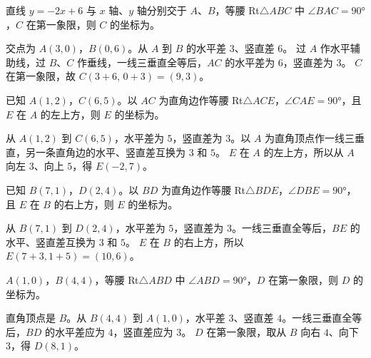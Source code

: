 \documentclass{exam-zh}
\begin{document}
\begin{question}[points=4]
  直线 $y = -2x + 6$ 与 $x$ 轴、$y$ 轴分别交于 $A$、$B$，等腰 Rt$\triangle ABC$ 中 $\angle BAC = 90°$，$C$ 在第一象限，则 $C$ 的坐标为\fillin。
  \paren[$(9,\,3)$]
  \begin{solutionblock}
    交点为 $A(3,0)$，$B(0,6)$。从 $A$ 到 $B$ 的水平差 $3$、竖直差 $6$。
    过 $A$ 作水平辅助线，过 $B$、$C$ 作垂线，一线三垂直全等后，$AC$ 的水平差为 $6$，竖直差为 $3$。
    $C$ 在第一象限，故 $C(3+6,\,0+3)=(9,3)$。
  \end{solutionblock}
\end{question}



\begin{question}[points=4]
  已知 $A(1,2)$，$C(6,5)$。以 $AC$ 为直角边作等腰 Rt$\triangle ACE$，$\angle CAE = 90°$，且 $E$ 在 $A$ 的左上方，则 $E$ 的坐标为\fillin。
  \paren[$(-2,\,7)$]
  \begin{solutionblock}
    从 $A(1,2)$ 到 $C(6,5)$，水平差为 $5$，竖直差为 $3$。以 $A$ 为直角顶点作一线三垂直，另一条直角边的水平、竖直差互换为 $3$ 和 $5$。
    $E$ 在 $A$ 的左上方，所以从 $A$ 向左 $3$、向上 $5$，得 $E(-2,7)$。
  \end{solutionblock}
\end{question}



\begin{question}[points=4]
  已知 $B(7,1)$，$D(2,4)$。以 $BD$ 为直角边作等腰 Rt$\triangle BDE$，$\angle DBE = 90°$，且 $E$ 在 $B$ 的右上方，则 $E$ 的坐标为\fillin。
  \paren[$(10,\,6)$]
  \begin{solutionblock}
    从 $B(7,1)$ 到 $D(2,4)$，水平差为 $5$，竖直差为 $3$。一线三垂直全等后，$BE$ 的水平、竖直差互换为 $3$ 和 $5$。
    $E$ 在 $B$ 的右上方，所以 $E(7+3,1+5)=(10,6)$。
  \end{solutionblock}
\end{question}



\begin{question}[points=4]
  $A(1, 0)$，$B(4, 4)$，等腰 Rt$\triangle ABD$ 中 $\angle ABD = 90°$，$D$ 在第一象限，则 $D$ 的坐标为\fillin。
  \paren[$(8,\,1)$]
  \begin{solutionblock}
    直角顶点是 $B$。从 $B(4,4)$ 到 $A(1,0)$，水平差 $3$、竖直差 $4$。一线三垂直全等后，$BD$ 的水平差应为 $4$，竖直差应为 $3$。
    $D$ 在第一象限，取从 $B$ 向右 $4$、向下 $3$，得 $D(8,1)$。
  \end{solutionblock}
\end{question}
\end{document}
